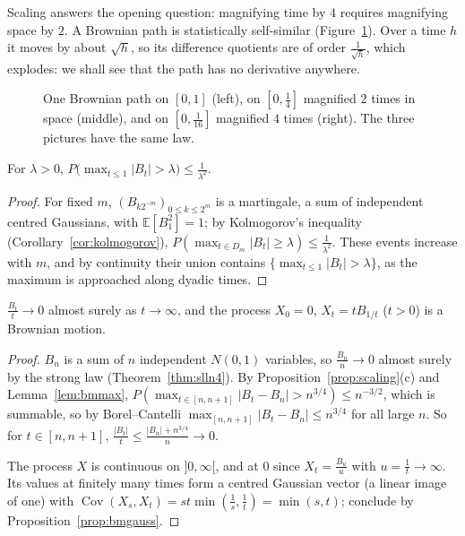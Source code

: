 Scaling answers the opening question: magnifying time by $4$ requires magnifying space by $2$. A Brownian path is
statistically self-similar (Figure~\ref{fig:zoom}). Over a time $h$ it moves by about $\sqrt h$, so its difference quotients are of order $\frac1{\sqrt h}$, which
explodes: we shall see that the path has no derivative anywhere.

\begin{figure}[ht]
\centering
{}
\caption{One Brownian path on $[0,1]$ (left), on $[0,\frac14]$ magnified $2$ times in space (middle), and on $[0,\frac1{16}]$ magnified $4$ times
(right). The three pictures have the same law.}
\label{fig:zoom}
\end{figure}

\begin{lemma}\label{lem:bmmax}
For $\lambda>0$, $P\bigl(\max_{t\le1}|B_t|>\lambda\bigr)\le\frac1{\lambda^2}$.
\end{lemma}
\begin{proof}
For fixed $m$, $(B_{k2^{-m}})_{0\le k\le2^m}$ is a martingale, a sum of independent centred Gaussians, with $\mathbb E[B_1^2]=1$; by Kolmogorov's inequality
(Corollary~\ref{cor:kolmogorov}), $P(\max_{t\in D_m}|B_t|\ge\lambda)\le\frac1{\lambda^2}$. These events increase with $m$, and by continuity their union contains
$\{\max_{t\le1}|B_t|>\lambda\}$, as the maximum is approached along dyadic times.
\end{proof}

\begin{proposition}\label{prop:inversion}
$\frac{B_t}t\to0$ almost surely as $t\to\infty$, and the process $X_0=0$, $X_t=tB_{1/t}$ ($t>0$) is a Brownian motion.
\end{proposition}
\begin{proof}
$B_n$ is a sum of $n$ independent $N(0,1)$ variables, so $\frac{B_n}n\to0$ almost surely by the strong law (Theorem~\ref{thm:slln4}). By Proposition~\ref{prop:scaling}(c) and
Lemma~\ref{lem:bmmax}, $P(\max_{t\in[n,n+1]}|B_t-B_n|>n^{3/4})\le n^{-3/2}$, which is summable, so by Borel--Cantelli $\max_{[n,n+1]}|B_t-B_n|\le n^{3/4}$ for all large $n$. So for $t\in[n,n+1]$,
$\frac{|B_t|}t\le\frac{|B_n|+n^{3/4}}n\to0$.

The process $X$ is continuous on $]0,\infty[$, and at $0$ since $X_t=\frac{B_u}u$ with $u=\frac1t\to\infty$. Its values at finitely many times form a centred Gaussian
vector (a linear image of one) with $\operatorname{Cov}(X_s,X_t)=st\min(\frac1s,\frac1t)=\min(s,t)$; conclude by Proposition~\ref{prop:bmgauss}.
\end{proof}

